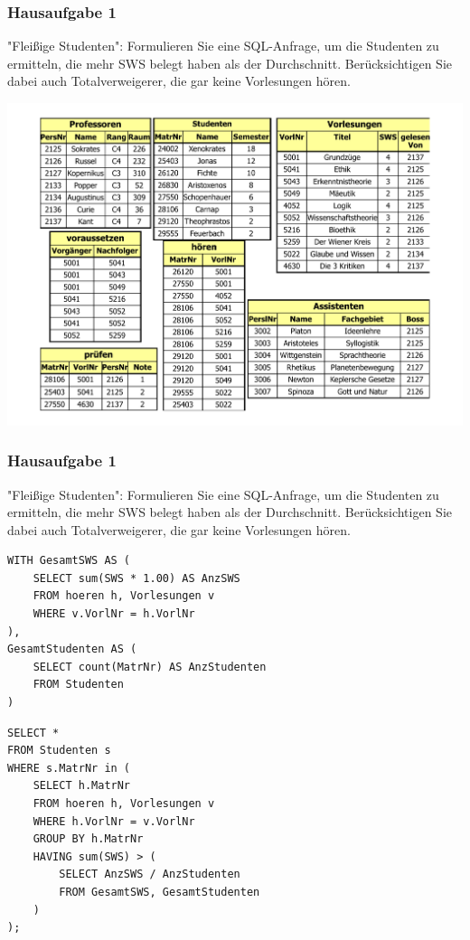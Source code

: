 \begin{frame}
	\frametitle{Hausaufgabe 1}
	\vspace{0.25cm}

	\begin{multicols}{2}
		"Fleißige Studenten": Formulieren Sie eine SQL-Anfrage, 
		um die Studenten zu ermitteln, die mehr SWS belegt haben als der Durchschnitt. 
		Berücksichtigen Sie dabei auch Totalverweigerer, die gar keine Vorlesungen hören.
		\vfill\columnbreak

		\begin{center}
			\includegraphics[height=.6\paperheight]{../img/uni.pdf}
		\end{center}
	\end{multicols}
\end{frame}

\begin{frame}[fragile]
	\frametitle{Hausaufgabe 1}
	\vspace{0.25cm}

	\begin{multicols}{2}
		"Fleißige Studenten": Formulieren Sie eine SQL-Anfrage, 
		um die Studenten zu ermitteln, die mehr SWS belegt haben als der Durchschnitt. 
		Berücksichtigen Sie dabei auch Totalverweigerer, die gar keine Vorlesungen hören.
		\begin{verbatim}
WITH GesamtSWS AS (
	SELECT sum(SWS * 1.00) AS AnzSWS
	FROM hoeren h, Vorlesungen v
	WHERE v.VorlNr = h.VorlNr
),
GesamtStudenten AS (
	SELECT count(MatrNr) AS AnzStudenten
	FROM Studenten
)
		\end{verbatim}
		\vfill\columnbreak

		\begin{verbatim}
SELECT *
FROM Studenten s
WHERE s.MatrNr in (
	SELECT h.MatrNr
	FROM hoeren h, Vorlesungen v
	WHERE h.VorlNr = v.VorlNr
	GROUP BY h.MatrNr
	HAVING sum(SWS) > (
		SELECT AnzSWS / AnzStudenten
		FROM GesamtSWS, GesamtStudenten
	)
);
		\end{verbatim}

	\end{multicols}
\end{frame}

